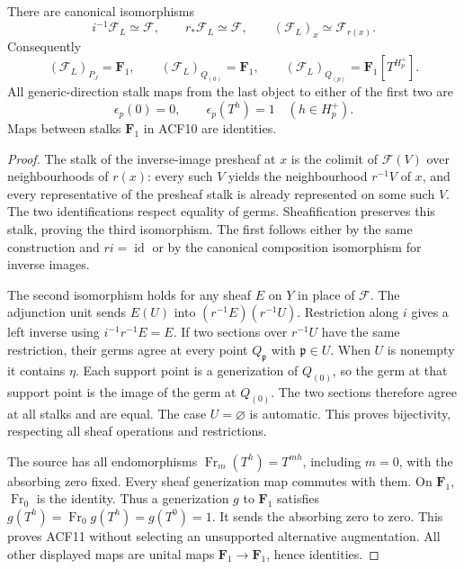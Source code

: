\begin{proposition}
There are canonical isomorphisms
\begin{equation}\tag{ACF9}
 i^{-1}\mathcal F_L\simeq\mathcal F,\qquad
 r_*\mathcal F_L\simeq\mathcal F,\qquad
 (\mathcal F_L)_x\simeq\mathcal F_{r(x)}.
\end{equation}
Consequently
\begin{equation}\tag{ACF10}
 (\mathcal F_L)_{P_J}=\mathbf F_1,\qquad
 (\mathcal F_L)_{Q_{(0)}}=\mathbf F_1,\qquad
 (\mathcal F_L)_{Q_{(p)}}=\mathbf F_1[T^{H_p^+}].
\end{equation}
All generic-direction stalk maps from the last object to either of the
first two are
\begin{equation}\tag{ACF11}
 \epsilon_p(0)=0,\qquad \epsilon_p(T^h)=1\quad(h\in H_p^+).
\end{equation}
Maps between stalks $\mathbf F_1$ in ACF10 are identities.
\end{proposition}
\begin{proof}
The stalk of the inverse-image presheaf at $x$ is the colimit of
$\mathcal F(V)$ over neighbourhoods of $r(x)$: every such $V$ yields the
neighbourhood $r^{-1}V$ of $x$, and every representative of the presheaf
stalk is already represented on some such $V$. The two identifications
respect equality of germs. Sheafification preserves this stalk, proving
the third isomorphism. The first follows either by the same construction
and $ri=\operatorname{id}$ or by the canonical composition isomorphism
for inverse images.

The second isomorphism holds for any sheaf $E$ on $Y$ in place of
$\mathcal F$. The adjunction unit sends $E(U)$ into
$(r^{-1}E)(r^{-1}U)$. Restriction along $i$ gives a left inverse using
$i^{-1}r^{-1}E=E$. If two sections over $r^{-1}U$ have the same restriction,
their germs agree at every point $Q_{\mathfrak p}$ with $\mathfrak p\in U$.
When $U$ is nonempty it contains $\eta$. Each support point is a
generization of $Q_{(0)}$, so the germ at that support point is the
image of the germ at $Q_{(0)}$. The two sections therefore agree at all
stalks and are equal. The case $U=\varnothing$ is automatic. This proves
bijectivity, respecting all sheaf operations and restrictions.

The source has all endomorphisms
$\operatorname{Fr}_m(T^h)=T^{mh}$, including $m=0$, with the absorbing
zero fixed. Every sheaf generization map commutes with them. On
$\mathbf F_1$, $\operatorname{Fr}_0$ is the identity. Thus a generization
$g$ to $\mathbf F_1$ satisfies
$g(T^h)=\operatorname{Fr}_0g(T^h)=g(T^0)=1$.
It sends the absorbing zero to zero. This proves ACF11 without selecting
an unsupported alternative augmentation. All other displayed maps are
unital maps $\mathbf F_1\to\mathbf F_1$, hence identities.
\end{proof}

